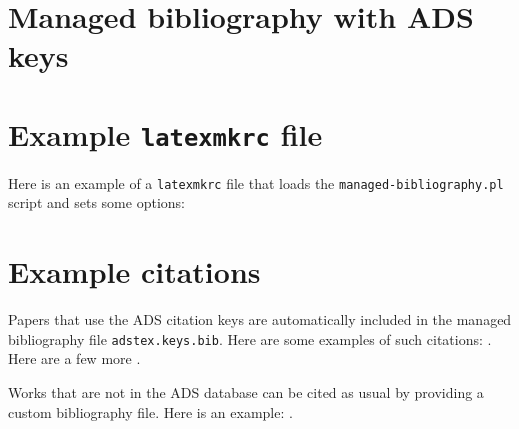 \documentclass{article}
\begin{document}
\section{Managed bibliography with ADS keys} 


\section{Example \texttt{latexmkrc} file}
Here is an example of a \texttt{latexmkrc} file that loads the \texttt{managed-bibliography.pl} script and sets some options:

\lstset{
  rangeprefix=\#\ ,       %
  rangesuffix=,          %
}

% 
% 

\section{Example citations}
Papers that use the ADS citation keys are automatically included in the managed bibliography file \texttt{adstex.keys.bib}.
Here are some examples of such citations:
\cite{%
    1958ZA.....46..108B,%
    1962AJ.....67..471K,%
    1966AJ.....71...64K%
}. 
Here are a few more
\cite{2002Sci...295...82K,2003PASP..115..763C}. 

Works that are not in the ADS database can be cited as usual by providing a custom bibliography file. Here is an example: \cite{mcgrail2004}.




\end{document}
